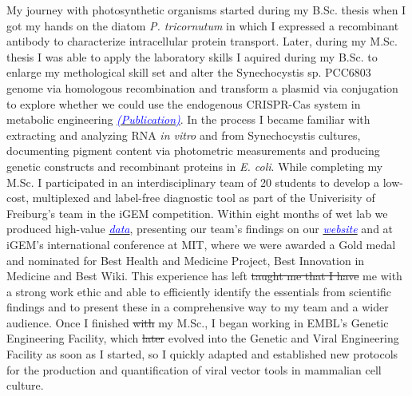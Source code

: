\documentclass[11pt,a4paper,sans]{moderncv}
\begin{document}
\begin{spacing}{1.15}
My journey with photosynthetic organisms started during my B.Sc. thesis when I got my hands on the diatom \textit{P. tricornutum} in which I expressed a recombinant antibody to characterize intracellular protein transport. 
Later, during my M.Sc. thesis I was able to apply the laboratory skills I aquired during my B.Sc. to enlarge my methological skill set and alter the Synechocystis sp. PCC6803 genome via homologous recombination and transform a plasmid via conjugation to explore whether we could use the endogenous CRISPR-Cas system in metabolic engineering {\href{https://www.ncbi.nlm.nih.gov/pubmed/29517395}{\textcolor{blue}{{\textit{(Publication)}}}}}. 
In the process I became familiar with extracting and analyzing RNA \textit{in vitro} and from Synechocystis cultures, documenting pigment content via photometric measurements and producing genetic constructs and recombinant proteins in \textit{E. coli}. 
While completing my M.Sc. I participated in an interdisciplinary team of 20 students to develop a low-cost, multiplexed and label-free diagnostic tool as part of the Univerisity of Freiburg's team in the iGEM competition.
Within eight months of wet lab we produced high-value {\href{https://www.ncbi.nlm.nih.gov/pubmed/29803867}{\textcolor{blue}{\textit{data}}}}, presenting our team's findings on our {\href{http://2015.igem.org/Team:Freiburg}{\textcolor{blue}{\textit{website}}}} and at iGEM's international conference at MIT, where we were awarded a Gold medal and nominated for Best Health and Medicine Project, Best Innovation in Medicine and Best Wiki.
This experience has left \sout{taught me that I have} me with a strong work ethic and able to efficiently identify the essentials from scientific findings and to present these in a comprehensive way to my team and a wider audience.
Once I finished \sout{with} my M.Sc., I began working in EMBL's Genetic Engineering Facility, which \sout {later} evolved into the Genetic and Viral Engineering Facility as soon as I started, so I quickly adapted and established new protocols for the production and quantification of viral vector tools in mammalian cell culture. 			

\end{spacing}
\end{document}
